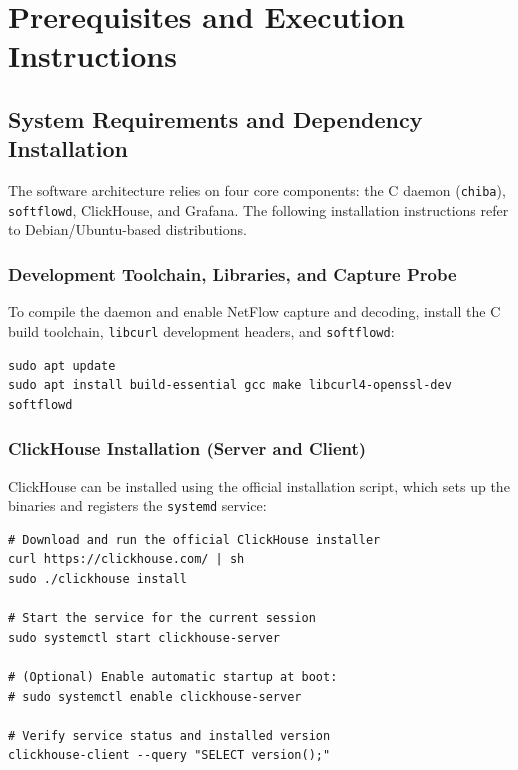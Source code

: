 \documentclass[11pt,a4paper]{article}
\newenvironment{codebox}[1][]{%
    \begin{tcolorbox}[
        colback=codebg,
        colframe=codeframe,
        boxrule=0.6pt,
        arc=1.5mm,
        left=3mm,
        right=3mm,
        top=2mm,
        bottom=2mm,
        fonttitle=\sffamily\bfseries\footnotesize,
        coltitle=chibadark,
        colbacktitle=codeframe!50!white,
        #1
    ]
}{%
    \end{tcolorbox}
}
\begin{document}
\section{Prerequisites and Execution Instructions}

\subsection{System Requirements and Dependency Installation}
The software architecture relies on four core components: the C daemon (\texttt{chiba}), \texttt{softflowd}, ClickHouse, and Grafana. The following installation instructions refer to Debian/Ubuntu-based distributions.

\subsubsection{Development Toolchain, Libraries, and Capture Probe}
To compile the daemon and enable NetFlow capture and decoding, install the C build toolchain, \texttt{libcurl} development headers, and \texttt{softflowd}:
\begin{codebox}[title={Toolchain and Probe Installation}]
\footnotesize
\begin{verbatim}
sudo apt update
sudo apt install build-essential gcc make libcurl4-openssl-dev softflowd
\end{verbatim}
\end{codebox}

\subsubsection{ClickHouse Installation (Server and Client)}
ClickHouse can be installed using the official installation script, which sets up the binaries and registers the \texttt{systemd} service:
\begin{codebox}[title={ClickHouse Server \& Client Installation}]
\footnotesize
\begin{verbatim}
# Download and run the official ClickHouse installer
curl https://clickhouse.com/ | sh
sudo ./clickhouse install

# Start the service for the current session
sudo systemctl start clickhouse-server

# (Optional) Enable automatic startup at boot:
# sudo systemctl enable clickhouse-server

# Verify service status and installed version
clickhouse-client --query "SELECT version();"
\end{verbatim}
\end{codebox}
\end{document}

